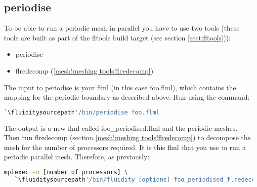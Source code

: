 \subsection{periodise}






To be able to run a periodic mesh in parallel you have to use two tools (these tools are built as part of the fltools build target (see section \ref{sect:fltools})):

\begin{itemize}
\item periodise
\item flredecomp (\ref{mesh!meshing tools!flredecomp})
\end{itemize}

The input to periodise is your flml (in this case foo.flml), which contains the mapping for the periodic boundary as described above. Run using the command:

\begin{lstlisting}[language=bash]
`\fluiditysourcepath'/bin/periodise foo.flml
\end{lstlisting}

The output is a new flml called  foo\_periodised.flml and the periodic meshes. Then run flredecomp (section \ref{mesh!meshing tools!flredecomp}) to decompose the mesh for the number of processors required. It is this flml that you use to run a periodic parallel mesh. Therefore, as previously:

\begin{lstlisting}[language=bash]
mpiexec -n [number of processors] \
   `\fluiditysourcepath'/bin/fluidity [options] foo_periodised_flredecomp.flml
\end{lstlisting}

